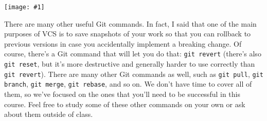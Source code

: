 \documentclass{article}
\newcommand{\imagewithdefaults}[1]{\texttt{[image: \#1]}}
\begin{document}
\imagewithdefaults{res/git-log-two.png}

There are many other useful Git commands. In fact, I said that one of the main purposes of VCS is to save snapshots of your work so that you can rollback to previous versions in case you accidentally implement a breaking change. Of course, there's a Git command that will let you do that: \texttt{git revert} (there's also \texttt{git reset}, but it's more destructive and generally harder to use correctly than \texttt{git revert}). There are many other Git commands as well, such as \texttt{git pull}, \texttt{git branch}, \texttt{git merge}, \texttt{git rebase}, and so on. We don't have time to cover all of them, so we've focused on the ones that you'll need to be successful in this course. Feel free to study some of these other commands on your own or ask about them outside of class.
\end{document}
